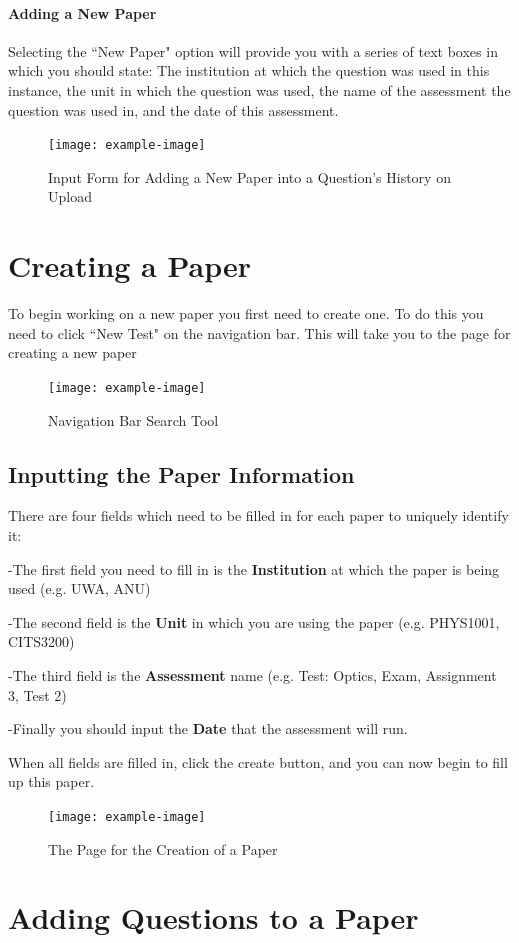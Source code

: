 \documentclass[12pt, a4paper, titlepage]{book}
\begin{document}
\subsubsection{Adding a New Paper}
Selecting the ``New Paper" option will provide you with a series of text boxes in which you should state: The institution at which the question was used in this instance, the unit in which the question was used, the name of the assessment the question was used in, and the date of this assessment.
\begin{figure}[htp]
\centering
\texttt{[image: example-image]}
\caption{Input Form for Adding a New Paper into a Question's History on Upload}
\end{figure}

\chapter{Creating a Paper}
To begin working on a new paper you first need to create one. To do this you need to click ``New Test" on the navigation bar. This will take you to the page for creating a new paper 
\begin{figure}[htp]
\centering
\texttt{[image: example-image]}
\caption{Navigation Bar Search Tool}
\end{figure}
\section{Inputting the Paper Information}

There are four fields which need to be filled in for each paper to uniquely identify it:
\par -The first field you need to fill in is the \textbf{Institution }at which the paper is being used (e.g. UWA, ANU)
\par -The second field is the \textbf{Unit} in which you are using the paper (e.g. PHYS1001, CITS3200)
\par -The third field is the \textbf{Assessment} name (e.g. Test: Optics, Exam, Assignment 3, Test 2)
\par -Finally you should input the \textbf{Date} that the assessment will run.
\par When all fields are filled in, click the create button, and you can now begin to fill up this paper.
\begin{figure}[htp]
\centering
\texttt{[image: example-image]}
\caption{The Page for the Creation of a Paper}
\end{figure}
\chapter{Adding Questions to a Paper} \label{ch:qadd}
\end{document}
